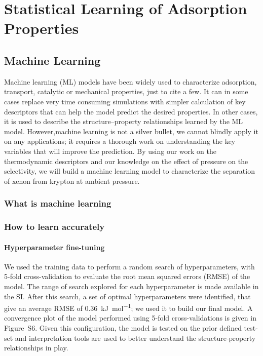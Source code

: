 \documentclass[main]{subfiles}
\begin{document}
\chapter{Statistical Learning of Adsorption Properties}
\vspace*{-1\baselineskip}

\section{Machine Learning}

Machine learning (ML) models have been widely used to characterize adsorption, transport, catalytic or mechanical properties, just to cite a few. It can in some cases replace very time consuming simulations with simpler calculation of key descriptors that can help the model predict the desired properties. In other cases, it is used to describe the structure--property relationships learned by the ML model. However,machine learning is not a silver bullet, we cannot blindly apply it on any applications; it requires a thorough work on understanding the key variables that will improve the prediction. By using our work on the thermodynamic descriptors and our knowledge on the effect of pressure on the selectivity, we will build a machine learning model to characterize the separation of xenon from krypton at ambient pressure.

\subsection{What is machine learning}



\subsection{How to learn accurately}


\subsubsection{Hyperparameter fine-tuning}

We used the training data to perform a random search of hyperparameters, with 5-fold cross-validation to evaluate the root mean squared errors (RMSE) of the model. The range of search explored for each hyperparameter is made available in the SI. After this search, a set of optimal hyperparameters were identified, that give an average RMSE of \SI{0.36}{\kilo\joule\per\mole}; we used it to build our final model. A convergence plot of the model performed using 5-fold cross-validations is given in Figure~S6. Given this configuration, the model is tested on the prior defined test-set and interpretation tools are used to better understand the structure-property relationships in play.
\end{document}

